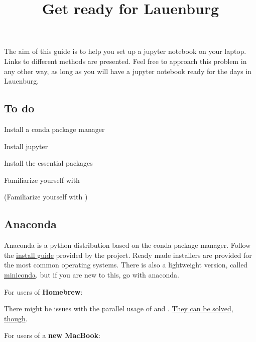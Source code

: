 \documentclass{article}
\title{Get ready for Lauenburg}
\author{}
\date{}
\begin{document}
\maketitle


The aim of this guide is to help you set up a jupyter notebook on your laptop. Links to different methods are presented. Feel free to approach this problem in any other way, as long as you will have a jupyter notebook ready for the days in Lauenburg.


\subsection*{ To do}

\begin{todolist}
  \item Install a conda package manager
  \item Install jupyter
  \item Install the essential packages
  \item Familiarize yourself with 
  \item (Familiarize yourself with )
\end{todolist}



\subsection*{ Anaconda} 

Anaconda is a python distribution based on the conda package manager. Follow the \href{https://docs.anaconda.com/anaconda/install/index.html}{install guide} provided by the project. Ready made installers are provided for the most common operating systems. There is also a lightweight version, called \href{https://docs.conda.io/en/latest/miniconda.html}{miniconda}. but if you are new to this, go with anaconda.

\vspace{2mm}

\noindent For users of \textbf{Homebrew}: 


\noindent There might be issues with the parallel usage of  and . \href{https://stackoverflow.com/questions/42859781/best-practices-with-anaconda-and-brew}{They can be solved, though}.

\vspace{2mm}

\noindent For users of a \textbf{new MacBook}: 
\end{document}
